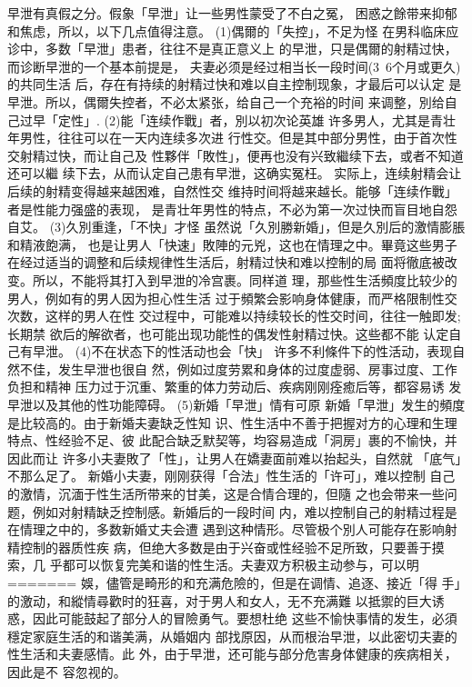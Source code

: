 \documentclass[12pt,UTF8]{ctexbook}
\begin{document}
早泄有真假之分。假象「早泄」让一些男性蒙受了不白之冤，
困惑之餘带来抑郁和焦虑，所以，以下几点值得注意。
(1)偶爾的「失控」，不足为怪
在男科临床应诊中，多数「早泄」患者，往往不是真正意义上
的早泄，只是偶爾的射精过快，而诊断早泄的一个基本前提是，
夫妻必须是经过相当长一段时间(3~6个月或更久)的共同生活
后，存在有持续的射精过快和难以自主控制现象，才最后可以认定
是早泄。所以，偶爾失控者，不必太紧张，给自己一个充裕的时间
来调整，別给自己过早「定性」.
(2)能「连续作戰」者，別以初次论英雄
许多男人，尤其是青壮年男性，往往可以在一天内连续多次进
行性交。但是其中部分男性，由于首次性交射精过快，而让自己及
性夥伴「敗性」，便再也没有兴致繼续下去，或者不知道还可以繼
续下去，从而认定自己患有早泄，这确实冤枉。
实际上，连续射精会让后续的射精变得越来越困难，自然性交
维持时间将越来越长。能够「连续作戰」者是性能力强盛的表现，
是青壮年男性的特点，不必为第一次过快而盲目地自怨自艾。
(3)久別重逢，「不快」才怪
虽然说「久別勝新婚」，但是久別后的激情膨脹和精液飽满，
也是让男人「快速」敗陣的元兇，这也在情理之中。畢竟这些男子
在经过适当的调整和后续规律性生活后，射精过快和难以控制的局
面将徹底被改变。所以，不能将其打入到早泄的冷宫裹。同样道
理，那些性生活頻度比较少的男人，例如有的男人因为担心性生活
过于頻繁会影响身体健康，而严格限制性交次数，这样的男人在性
交过程中，可能难以持续较长的性交时间，往往一触即发;长期禁
欲后的解欲者，也可能出现功能性的偶发性射精过快。这些都不能
认定自己有早泄。
(4)不在状态下的性活动也会「快」
许多不利條件下的性活动，表现自然不佳，发生早泄也很自
然，例如过度劳累和身体的过度虚弱、房事过度、工作负担和精神
压力过于沉重、繁重的体力劳动后、疾病刚刚痊癒后等，都容易诱
发早泄以及其他的性功能障碍。
(5)新婚「早泄」情有可原
新婚「早泄」发生的頻度是比较高的。由于新婚夫妻缺乏性知
识、性生活中不善于把握对方的心理和生理特点、性经验不足、彼
此配合缺乏默契等，均容易造成「洞房」裹的不愉快，并因此而让
许多小夫妻敗了「性」，让男人在嬌妻面前难以抬起头，自然就
「底气」不那么足了。
新婚小夫妻，刚刚获得「合法」性生活的「许可」，难以控制
自己的激情，沉湎于性生活所带来的甘美，这是合情合理的，但隨
之也会带来一些问题，例如对射精缺乏控制感。新婚后的一段时间
内，难以控制自己的射精过程是在情理之中的，多数新婚丈夫会遭
遇到这种情形。尽管极个別人可能存在影响射精控制的器质性疾
病，但绝大多数是由于兴奋或性经验不足所致，只要善于摸索，几
乎都可以恢复完美和谐的性生活。夫妻双方积极主动参与，可以明
=======
娛，儘管是畸形的和充满危險的，但是在调情、追逐、接近「得
手」的激动，和縱情尋歡时的狂喜，对于男人和女人，无不充满難
以抵禦的巨大诱惑，因此可能鼓起了部分人的冒險勇气。要想杜绝
这些不愉快事情的发生，必須穩定家庭生活的和谐美满，从婚姻内
部找原因，从而根治早泄，以此密切夫妻的性生活和夫妻感情。此
外，由于早泄，还可能与部分危害身体健康的疾病相关，因此是不
容忽视的。
\end{document}
